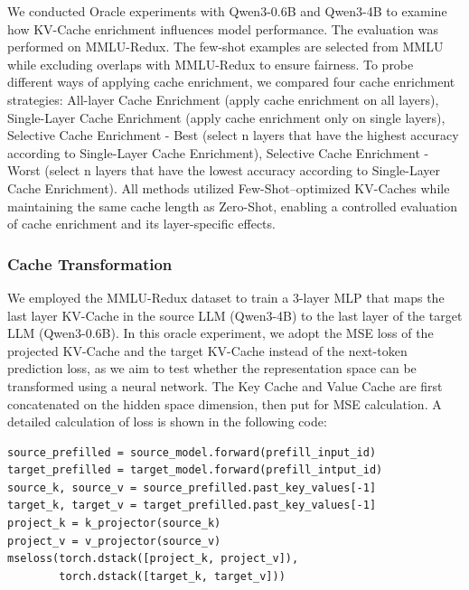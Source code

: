We conducted Oracle experiments with Qwen3-0.6B and Qwen3-4B to examine how KV-Cache enrichment influences model performance. The evaluation was performed on MMLU-Redux. The few-shot examples are selected from MMLU while excluding overlaps with MMLU-Redux to ensure fairness. To probe different ways of applying cache enrichment, we compared four cache enrichment strategies: All-layer Cache Enrichment (apply cache enrichment on all layers), Single-Layer Cache Enrichment (apply cache enrichment only on single layers), Selective Cache Enrichment - Best (select n layers that have the highest accuracy according to Single-Layer Cache Enrichment), Selective Cache Enrichment - Worst (select n layers that have the lowest accuracy according to Single-Layer Cache Enrichment). All methods utilized Few-Shot–optimized KV-Caches while maintaining the same cache length as Zero-Shot, enabling a controlled evaluation of cache enrichment and its layer-specific effects.

\subsubsection{Cache Transformation}
\label{sec:appendix/setup/transformation_oracle}

We employed the MMLU-Redux dataset to train a 3-layer MLP that maps the last layer KV-Cache in the source LLM (Qwen3-4B) to the last layer of the target LLM (Qwen3-0.6B). In this oracle experiment, we adopt the MSE loss of the projected KV-Cache and the target KV-Cache instead of the next-token prediction loss, as we aim to test whether the representation space can be transformed using a neural network. The Key Cache and Value Cache are first concatenated on the hidden space dimension, then put for MSE calculation. A detailed calculation of loss is shown in the following code:
\begin{verbatim}
source_prefilled = source_model.forward(prefill_input_id)
target_prefilled = target_model.forward(prefill_intput_id)
source_k, source_v = source_prefilled.past_key_values[-1]
target_k, target_v = target_prefilled.past_key_values[-1]
project_k = k_projector(source_k)
project_v = v_projector(source_v)
mseloss(torch.dstack([project_k, project_v]), 
        torch.dstack([target_k, target_v]))
\end{verbatim}

